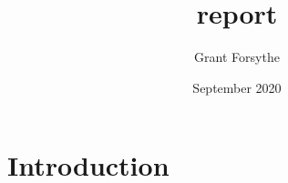 \documentclass{article}
\title{report}
\author{Grant Forsythe}
\date{September 2020}
\begin{document}
\maketitle

\section{Introduction}
\end{document}

